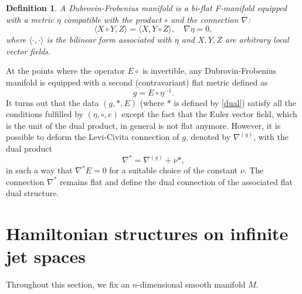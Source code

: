 \documentclass[11pt,a4paper]{amsart}
\numberwithin{equation}{section}
\newtheorem{definition}[theorem]{Definition}
\numberwithin{equation}{section}
\begin{document}
\begin{definition}
A Dubrovin-Frobenius manifold is a bi-flat F-manifold equipped with 
 a metric $\eta$ compatible with the product $\circ$ and the connection $\nabla$:
\[\langle X\circ Y,Z\rangle=\langle X,Y\circ Z\rangle,\quad \nabla\eta=0,\]
where $\langle\cdot,\cdot\rangle$ is the bilinear form associated with $\eta$ and $X,Y,Z$ are arbitrary local vector fields.
\end{definition}
\noindent
At the points where the operator $E\circ$ is invertible, any Dubrovin-Frobenius manifold is equipped with a second (contravariant) flat metric defined as 
\begin{equation}\label{int_form}
g=E\circ\eta^{-1}.
\end{equation}
It turns out that the data $(g,*,E)$ (where $*$ is defined by \eqref{dual}) satisfy all the
 conditions fulfilled by $(\eta,\circ,e)$  except the fact that the  Euler vector field, which is
  the unit of the dual product, in general is not flat anymore. However, it is possible to deform the Levi-Civita connection of $g$, denoted by $\nabla^{(g)}$, with the dual product
 \[\nabla^*=\nabla^{(g)}+\nu*,\]
 in such a way that $\nabla^*E=0$ for a suitable choice of the constant $\nu$. The connection $\nabla^*$ remains flat and define the dual connection of the associated flat dual structure.

\section{Hamiltonian structures on infinite jet spaces}
Throughout this section, we fix an $n$-dimensional smooth manifold $M$.
\end{document}
